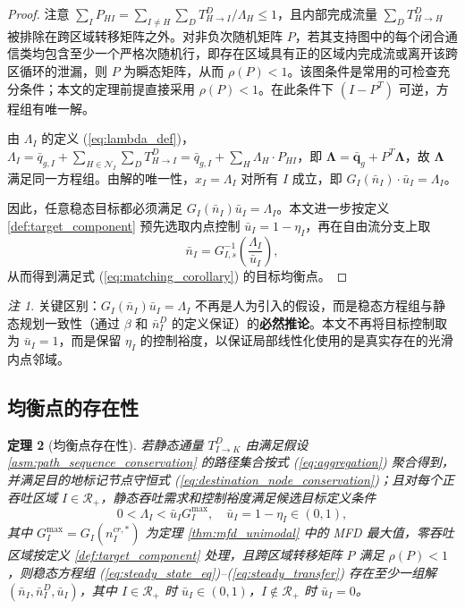 \documentclass[a4paper,12pt]{article}
\theoremstyle{plain}
\newtheorem{theorem}{定理}[section]
\theoremstyle{definition}
\theoremstyle{remark}
\newtheorem{remark}[theorem]{注}
\begin{document}
\begin{proof}
注意 $\sum_I P_{HI} = \sum_{I\ne H}\sum_D T_{H \to I}^D / \Lambda_H \leq 1$，且内部完成流量 $\sum_D T_{H \to H}^D$ 被排除在跨区域转移矩阵之外。对非负次随机矩阵 $P$，若其支持图中的每个闭合通信类均包含至少一个严格次随机行，即存在区域具有正的区域内完成流或离开该跨区循环的泄漏，则 $P$ 为瞬态矩阵，从而 $\rho(P)<1$。该图条件是常用的可检查充分条件；本文的定理前提直接采用 $\rho(P)<1$。在此条件下 $(I-P^T)$ 可逆，方程组有唯一解。

由 $\Lambda_I$ 的定义 (\ref{eq:lambda_def})，$\Lambda_I = \bar{q}_{g,I} + \sum_{H\in\mathcal N_I} \sum_D T_{H \to I}^D = \bar{q}_{g,I} + \sum_H \Lambda_H \cdot P_{HI}$，即 $\bm{\Lambda} = \bar{\bm{q}}_g + P^T \bm{\Lambda}$，故 $\bm{\Lambda}$ 满足同一方程组。由解的唯一性，$x_I = \Lambda_I$ 对所有 $I$ 成立，即 $G_I(\bar{n}_I) \cdot \bar{u}_I = \Lambda_I$。

因此，任意稳态目标都必须满足 $G_I(\bar n_I)\bar u_I=\Lambda_I$。本文进一步按定义 \ref{def:target_component} 预先选取内点控制 $\bar u_I=1-\eta_I$，再在自由流分支上取
\begin{equation}
    \bar n_I=G_{I,s}^{-1}\left(\frac{\Lambda_I}{\bar u_I}\right),
\end{equation}
从而得到满足式 (\ref{eq:matching_corollary}) 的目标均衡点。
\end{proof}

\begin{remark}
关键区别：$G_I(\bar{n}_I)\bar u_I = \Lambda_I$ 不再是人为引入的假设，而是稳态方程组与静态规划一致性（通过 $\beta$ 和 $\bar{n}_I^D$ 的定义保证）的\textbf{必然推论}。本文不再将目标控制取为 $\bar u_I=1$，而是保留 $\eta_I$ 的控制裕度，以保证局部线性化使用的是真实存在的光滑内点邻域。
\end{remark}

\subsection{均衡点的存在性}

\begin{theorem}[均衡点存在性]\label{thm:equilibrium_existence}
若静态通量 $T_{I\to K}^D$ 由满足假设 \ref{asm:path_sequence_conservation} 的路径集合按式 (\ref{eq:aggregation}) 聚合得到，并满足目的地标记节点守恒式 (\ref{eq:destination_node_conservation})；且对每个正吞吐区域 $I \in \mathcal{R}_+$，静态吞吐需求和控制裕度满足候选目标定义条件
\begin{equation}\label{eq:margin_feasibility}
    0<\Lambda_I < \bar u_I G_I^{\max},
    \quad \bar u_I=1-\eta_I\in(0,1),
\end{equation}
其中 $G_I^{\max} = G_I(n_I^{cr,*})$ 为定理 \ref{thm:mfd_unimodal} 中的 MFD 最大值，零吞吐区域按定义 \ref{def:target_component} 处理，且跨区域转移矩阵 $P$ 满足 $\rho(P)<1$，则稳态方程组 (\ref{eq:steady_state_eq})--(\ref{eq:steady_transfer}) 存在至少一组解 $(\bar{n}_I, \bar{n}_I^D, \bar{u}_I)$，其中 $I\in\mathcal R_+$ 时 $\bar{u}_I \in (0,1)$，$I\notin\mathcal R_+$ 时 $\bar u_I=0$。
\end{theorem}
\end{document}
